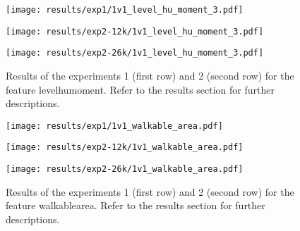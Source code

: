 \begin{figure}[h!]
	\centering
	\begin{minipage}{0.4\linewidth}
		\texttt{[image: results/exp1/1v1\_level\_hu\_moment\_3.pdf]}
	\end{minipage}
	
	\begin{minipage}{0.4\linewidth}
		\texttt{[image: results/exp2-12k/1v1\_level\_hu\_moment\_3.pdf]}
	\end{minipage}
	\begin{minipage}{0.4\linewidth}
		\texttt{[image: results/exp2-26k/1v1\_level\_hu\_moment\_3.pdf]}
	\end{minipage}
	
	\caption[ Results: Feature level\textunderscore hu\textunderscore moment]{ Results of the experiments 1 (first row) and 2 (second row) for the feature level\textunderscore hu\textunderscore moment. Refer to the results section for further descriptions. }
	\label{fig:appendix_level_hu_moment_3}
\end{figure}

\begin{figure}[h!]
	\centering
	\begin{minipage}{0.4\linewidth}
		\texttt{[image: results/exp1/1v1\_walkable\_area.pdf]}
	\end{minipage}
	
	\begin{minipage}{0.4\linewidth}
		\texttt{[image: results/exp2-12k/1v1\_walkable\_area.pdf]}
	\end{minipage}
	\begin{minipage}{0.4\linewidth}
		\texttt{[image: results/exp2-26k/1v1\_walkable\_area.pdf]}
	\end{minipage}
	
	\caption[ Results: Feature walkable\textunderscore area]{ Results of the experiments 1 (first row) and 2 (second row) for the feature walkable\textunderscore area. Refer to the results section for further descriptions. }
	\label{fig:appendix_walkable_area}
\end{figure}
\newpage 



